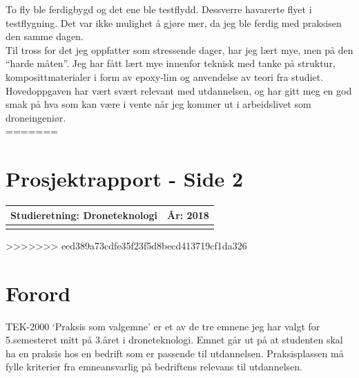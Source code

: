 \documentclass[12pt, a4paper]{article}
\begin{document}
To fly ble ferdigbygd og det ene ble testflydd. Dessverre havarerte flyet i testflygning. Det var ikke mulighet å gjøre mer, da jeg ble ferdig med praksisen den samme dagen. \\

Til tross for det jeg oppfatter som stressende dager, har jeg lært mye, men på den ``harde måten''. Jeg har fått lært mye innenfor teknisk med tanke på struktur, komposittmaterialer i form av epoxy-lim og anvendelse av teori fra studiet. Hovedoppgaven har vært svært relevant med utdannelsen, og har gitt meg en god smak på hva som kan være i vente når jeg kommer ut i arbeidslivet som droneingeniør. \\

\newpage
=======
\maketitle
\clearpage
\section{Prosjektrapport - Side 2}

\begin{tabular}{ | l | l | }
	\hline
	\textbf{Studieretning: Droneteknologi}\hspace{5cm} & \textbf{År: 2018} \\
	\hline
	\vspace{1cm}
	\hline
\end{tabular}


\clearpage
\begin{minipage}[b]{1\linewidth}
	\tableofcontents
	\vspace{.5cm}
\end{minipage}
\begin{minipage}[b]{1\linewidth}
	\listoffigures
\end{minipage}
\clearpage
>>>>>>> eed389a73cdfe35f23f5d8becd413719cf1da326

\section{Forord}
TEK-2000 `Praksis som valgemne' er et av de tre emnene jeg har valgt for 5.semesteret mitt på 3.året i droneteknologi. Emnet går ut på at studenten skal ha en praksis hos en bedrift som er passende til utdannelsen. Praksisplassen må fylle kriterier fra emneansvarlig på bedriftens relevans til utdannelsen. \\
\end{document}

